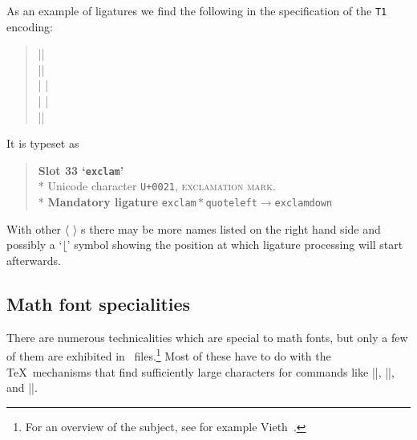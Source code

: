 \documentclass[a4paper]{article}
\makeatletter
\DeclareRobustCommand\meta[1]{%
   \ensuremath{\langle}%
   \sbox{\z@}{%
      \setlanguage\l@nohyphenation
      \normalfont\itshape #1\/%
      \setlanguage\language
   }%
   \unhbox\z@
   \ensuremath{\rangle}%
}
\DeclareRobustCommand\ETX{\textsmaller{ETX}}
\makeatother
\begin{document}
As an example of ligatures we find the following in the specification 
of the \texttt{T1} encoding:
\begin{quote}
  ||\\
  ||\\
  |  |\\
  |  |\\
  |\endsetslot|
\end{quote}
It is typeset as
\begin{quote}
  \textbf{Slot 33 `\texttt{exclam}'}\\*
  Unicode character \texttt{U+0021}, \textsc{exclamation mark}.\\*
  \textbf{Mandatory ligature} 
  \texttt{exclam}${}*{}$\texttt{quoteleft}${}\rightarrow
  {}$\texttt{exclamdown}
\end{quote}
With other \meta{ligtype}s there may be more names listed on the 
right hand side and possibly a `$\lfloor$' symbol showing the 
position at which ligature processing will start afterwards.
  

\subsection{Math font specialities}

There are numerous technicalities which are special to math fonts, but 
only a few of them are exhibited in \ETX\ files.\footnote{For an 
overview of the subject, see for example Vieth~\cite{Vieth2001}.} Most 
of these have to do with the \TeX\ mechanisms that find sufficiently 
large characters for commands like |\left|, |\sqrt|, and |\widetilde|.
\end{document}
